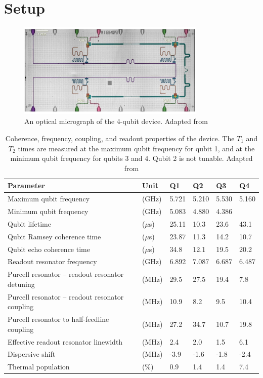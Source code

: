 \chapter{Setup}
\label{app:setup}

\begin{figure}[htp]
  \centering
 \includegraphics[width=0.8\textwidth]{appendices/figs/BF1_device.png}
 \caption{An optical micrograph of the 4-qubit device. Adapted from \cite{Andersen2019a}}
 \label{fig:BF1_device_picture}
\end{figure}

\begin{table}[ht]
\centering
\caption{Coherence, frequency, coupling, and readout properties of the device. The $T_1$ and $T_2$ times are measured at the maximum qubit frequency for qubit 1, and at the minimum qubit frequency for qubits 3 and 4. Qubit 2 is not tunable. Adapted from \cite{Andersen2019a}}
\begin{tabularx}{\textwidth}{llllll}
\toprule
Parameter & Unit & \textbf{Q1} & \textbf{Q2} & \textbf{Q3} & \textbf{Q4} \\ 
\midrule
Maximum qubit frequency & (GHz) & \multicolumn{1}{c}{5.721} & \multicolumn{1}{c}{5.210} & \multicolumn{1}{c}{5.530} & \multicolumn{1}{c}{5.160} \\
Minimum qubit frequency & (GHz) & 5.083 & 4.880 & 4.386 &  \\
Qubit lifetime & ($\mu$s) & 25.11 & 10.3 & 23.6 & 43.1 \\
Qubit Ramsey coherence time & ($\mu$s) & 23.87 & 11.3 & 14.2 & 10.7 \\
Qubit echo coherence time & ($\mu$s) & 34.8 & 12.1 & 19.5 & 20.2 \\
Readout resonator frequency & (GHz) & 6.892 & 7.087 & 6.687 & 6.487 \\
Purcell resonator – readout resonator detuning & (MHz) & 29.5 & 27.5 & 19.4 & 7.8 \\
Purcell resonator – readout resonator coupling & (MHz) & 10.9 & 8.2 & 9.5 & 10.4 \\
Purcell resonator to half-feedline coupling & (MHz) & 27.2 & 34.7 & 10.7 & 19.8 \\
Effective readout resonator linewidth & (MHz) & 2.4 & 2.0 & 1.5 & 6.1 \\
Dispersive shift & (MHz) & -3.9 & -1.6 & -1.8 & -2.4 \\
Thermal population & (\%) & 0.9 & 1.4 & 1.4 & 7.4 \\ 
\bottomrule
\end{tabularx}
\end{table}
